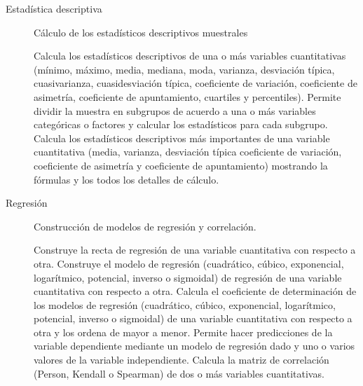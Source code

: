 \documentclass[10pt,twoside,spanish]{article}
\numberwithin{equation}{section}
\begin{document}
\begin{description}
\item[Estadística descriptiva] Cálculo de los estadísticos descriptivos muestrales
\begin{itemize}
 Calcula los estadísticos descriptivos de una o más variables cuantitativas (mínimo, máximo, media, mediana, moda,
varianza, desviación típica, cuasivarianza, cuasidesviación típica, coeficiente de variación, coeficiente de asimetría, coeficiente de
apuntamiento, cuartiles y percentiles).
Permite dividir la muestra en subgrupos de acuerdo a una o más variables categóricas o factores y calcular los estadísticos para cada
subgrupo.
 Calcula los estadísticos descriptivos más importantes de una variable cuantitativa (media, varianza, desviación
típica coeficiente de variación, coeficiente de asimetría y coeficiente de apuntamiento) mostrando la fórmulas y los todos los detalles de
cálculo. 
\end{itemize}

\item[Regresión] Construcción de modelos de regresión y correlación.
\begin{itemize}
 Construye la recta de regresión de una variable cuantitativa con respecto a otra. 
 Construye el modelo de regresión (cuadrático, cúbico, exponencial, logarítmico, potencial, inverso o sigmoidal)
de regresión de una variable cuantitativa con respecto a otra.
 Calcula el coeficiente de determinación de los modelos de regresión (cuadrático, cúbico, exponencial,
logarítmico, potencial, inverso o sigmoidal) de una variable cuantitativa con respecto a otra y los ordena de mayor a menor. 
 Permite hacer predicciones de la variable dependiente mediante un modelo de regresión dado y uno o varios valores de la
variable independiente.  
 Calcula la matriz de correlación (Person, Kendall o Spearman) de dos o más variables cuantitativas. 
\end{itemize}


\end{description}
\end{document}
